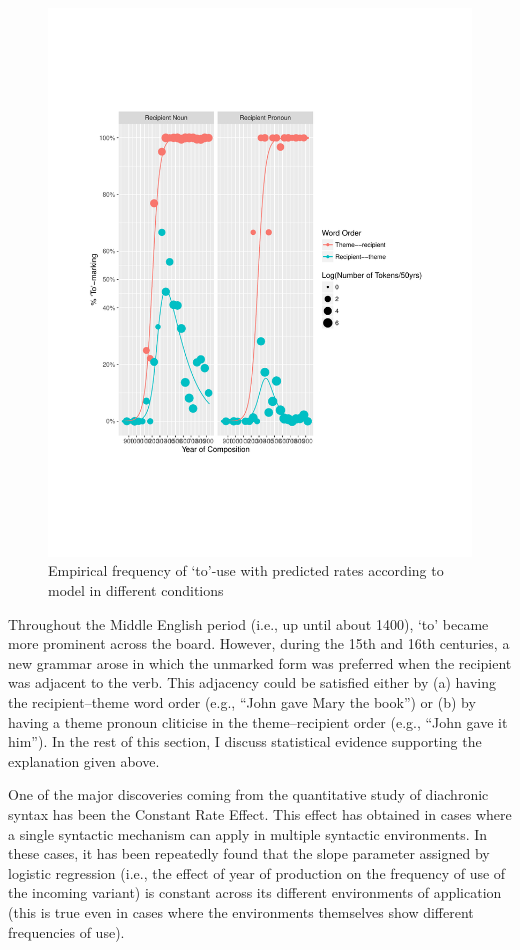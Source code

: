 	\begin{figure}[p!]
		\includegraphics[width=.95\linewidth]{../images/to-marking-graph}
		\caption{Empirical frequency of `to'-use with predicted rates according to model in different conditions}
		\label{fig:to-use}
	\end{figure}

	Throughout the Middle English period (i.e., up until about 1400), `to' became more prominent across the board. However, during the 15th and 16th centuries, a new grammar arose in which the unmarked form was preferred when the recipient was adjacent to the verb. This adjacency could be satisfied either by (a) having the recipient--theme word order (e.g., ``John gave Mary the book'') or (b) by having a theme pronoun cliticise in the theme--recipient order (e.g., ``John gave it him''). In the rest of this section, I discuss statistical evidence supporting the explanation given above.

	One of the major discoveries coming from the quantitative study of diachronic syntax has been the Constant Rate Effect. This effect has obtained in cases where a single syntactic mechanism can apply in multiple syntactic environments. In these cases, it has been repeatedly found that the slope parameter assigned by logistic regression (i.e., the effect of year of production on the frequency of use of the incoming variant) is constant across its different environments of application (this is true even in cases where the environments themselves show different frequencies of use). 

